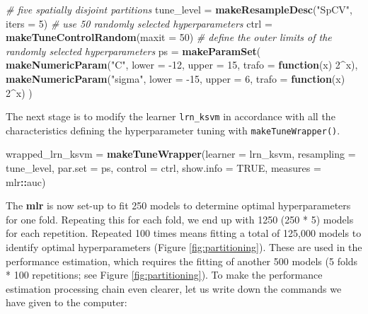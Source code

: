 \documentclass[]{krantz}
\newenvironment{Shaded}{\begin{snugshade}}{\end{snugshade}}
\newcommand{\CommentTok}[1]{\textcolor[rgb]{0.37,0.37,0.37}{\textit{#1}}}
\newcommand{\ControlFlowTok}[1]{\textcolor[rgb]{0.27,0.27,0.27}{\textbf{#1}}}
\newcommand{\DataTypeTok}[1]{\textcolor[rgb]{0.27,0.27,0.27}{#1}}
\newcommand{\DecValTok}[1]{\textcolor[rgb]{0.06,0.06,0.06}{#1}}
\newcommand{\KeywordTok}[1]{\textcolor[rgb]{0.27,0.27,0.27}{\textbf{#1}}}
\newcommand{\NormalTok}[1]{#1}
\newcommand{\OperatorTok}[1]{\textcolor[rgb]{0.43,0.43,0.43}{\textbf{#1}}}
\newcommand{\OtherTok}[1]{\textcolor[rgb]{0.37,0.37,0.37}{#1}}
\newcommand{\StringTok}[1]{\textcolor[rgb]{0.5,0.5,0.5}{#1}}
\begin{document}
\begin{Shaded}
\begin{Highlighting}[]
\CommentTok{# five spatially disjoint partitions}
\NormalTok{tune_level =}\StringTok{ }\KeywordTok{makeResampleDesc}\NormalTok{(}\StringTok{"SpCV"}\NormalTok{, }\DataTypeTok{iters =} \DecValTok{5}\NormalTok{)}
\CommentTok{# use 50 randomly selected hyperparameters}
\NormalTok{ctrl =}\StringTok{ }\KeywordTok{makeTuneControlRandom}\NormalTok{(}\DataTypeTok{maxit =} \DecValTok{50}\NormalTok{)}
\CommentTok{# define the outer limits of the randomly selected hyperparameters}
\NormalTok{ps =}\StringTok{ }\KeywordTok{makeParamSet}\NormalTok{(}
  \KeywordTok{makeNumericParam}\NormalTok{(}\StringTok{"C"}\NormalTok{, }\DataTypeTok{lower =} \DecValTok{-12}\NormalTok{, }\DataTypeTok{upper =} \DecValTok{15}\NormalTok{, }\DataTypeTok{trafo =} \ControlFlowTok{function}\NormalTok{(x) }\DecValTok{2}\OperatorTok{^}\NormalTok{x),}
  \KeywordTok{makeNumericParam}\NormalTok{(}\StringTok{"sigma"}\NormalTok{, }\DataTypeTok{lower =} \DecValTok{-15}\NormalTok{, }\DataTypeTok{upper =} \DecValTok{6}\NormalTok{, }\DataTypeTok{trafo =} \ControlFlowTok{function}\NormalTok{(x) }\DecValTok{2}\OperatorTok{^}\NormalTok{x)}
\NormalTok{  )}
\end{Highlighting}
\end{Shaded}

The next stage is to modify the learner \texttt{lrn\_ksvm} in accordance with all the characteristics defining the hyperparameter tuning with \texttt{makeTuneWrapper()}.

\begin{Shaded}
\begin{Highlighting}[]
\NormalTok{wrapped_lrn_ksvm =}\StringTok{ }\KeywordTok{makeTuneWrapper}\NormalTok{(}\DataTypeTok{learner =}\NormalTok{ lrn_ksvm, }
                                   \DataTypeTok{resampling =}\NormalTok{ tune_level,}
                                   \DataTypeTok{par.set =}\NormalTok{ ps,}
                                   \DataTypeTok{control =}\NormalTok{ ctrl, }
                                   \DataTypeTok{show.info =} \OtherTok{TRUE}\NormalTok{,}
                                   \DataTypeTok{measures =}\NormalTok{ mlr}\OperatorTok{::}\NormalTok{auc)}
\end{Highlighting}
\end{Shaded}

The \textbf{mlr} is now set-up to fit 250 models to determine optimal hyperparameters for one fold.
Repeating this for each fold, we end up with 1250 (250 * 5) models for each repetition.
Repeated 100 times means fitting a total of 125,000 models to identify optimal hyperparameters (Figure \ref{fig:partitioning}).
These are used in the performance estimation, which requires the fitting of another 500 models (5 folds * 100 repetitions; see Figure \ref{fig:partitioning}).
To make the performance estimation processing chain even clearer, let us write down the commands we have given to the computer:
\end{document}
